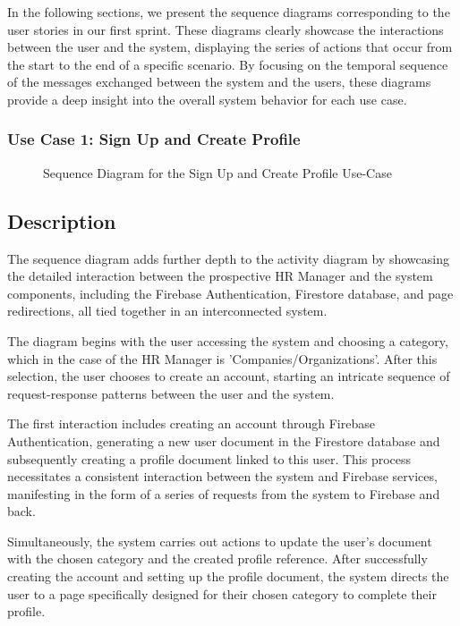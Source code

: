 In the following sections, we present the sequence diagrams corresponding to the user stories in our first sprint. These diagrams clearly showcase the interactions between the user and the system, displaying the series of actions that occur from the start to the end of a specific scenario. By focusing on the temporal sequence of the messages exchanged between the system and the users, these diagrams provide a deep insight into the overall system behavior for each use case.

\subsubsection{Use Case 1: Sign Up and Create Profile} 


\begin{figure}[H]
    \centering
    \caption{ Sequence Diagram for the Sign Up and Create Profile Use-Case }
    \label{fig:UseCase1_Sequence_Diagram}
\end{figure}

\newpage
\subsection*{Description}

The sequence diagram adds further depth to the activity diagram by showcasing the detailed interaction between the prospective HR Manager and the system components, including the Firebase Authentication, Firestore database, and page redirections, all tied together in an interconnected system.

The diagram begins with the user accessing the system and choosing a category, which in the case of the HR Manager is 'Companies/Organizations'. After this selection, the user chooses to create an account, starting an intricate sequence of request-response patterns between the user and the system.

The first interaction includes creating an account through Firebase Authentication, generating a new user document in the Firestore database and subsequently creating a profile document linked to this user. This process necessitates a consistent interaction between the system and Firebase services, manifesting in the form of a series of requests from the system to Firebase and back.

Simultaneously, the system carries out actions to update the user's document with the chosen category and the created profile reference. After successfully creating the account and setting up the profile document, the system directs the user to a page specifically designed for their chosen category to complete their profile.

